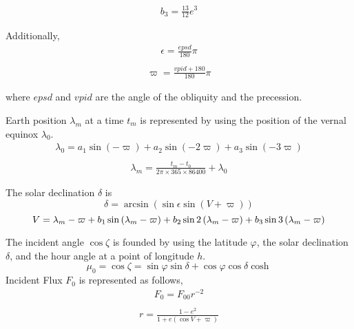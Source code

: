 \begin{equation}
\begin{array}{l}
b_{3}=\frac{13}{12} e^{3}
\end{array}
\end{equation}

Additionally, \begin{equation}
\begin{array}{l}
\epsilon=\frac{e p s d}{180} \pi \\
\end{array}
\end{equation} \begin{equation}
\begin{array}{l}
\varpi=\frac{v p i d+180}{180} \pi
\end{array}
\end{equation}

where \(epsd\) and \(vpid\) are the angle of the obliquity and the
precession.

Earth position \(\lambda_{m}\) at a time \(t_m\) is represented by using
the position of the vernal equinox \(\lambda_{0}\). \begin{equation}
\begin{array}{c}
\lambda_{0}=a_{1} \sin (-\varpi)+a_{2} \sin (-2 \varpi)+a_{3} \sin (-3 \varpi) \\
\end{array}
\end{equation} \begin{equation}
\begin{array}{c}
\lambda_{m}=\frac{t_{m}-t_{0}}{2 \pi \times 365 \times 86400}+\lambda_{0}
\end{array}
\end{equation}

The solar declination \(\delta\) is \begin{equation}
\delta=\arcsin (\sin \epsilon \sin (V+\varpi))
\end{equation} \begin{equation}
\\V=\lambda_{m}-\varpi+b_{1} \sin \left(\lambda_{m}-\varpi\right)+b_{2} \sin 2\left(\lambda_{m}-\varpi\right)+b_{3} \sin 3\left(\lambda_{m}-\varpi\right)
\end{equation}

The incident angle \(\cos \zeta\) is founded by using the latitude
\(\varphi\), the solar declination \(\delta\), and the hour angle at a
point of longitude \(h\). \begin{equation}
\mu_{0}=\cos \zeta=\sin \varphi \sin \delta+\cos \varphi \cos \delta \cosh
\end{equation} Incident Flux \(F_0\) is represented as follows, \begin{equation}
\begin{array}{c}
F_{0}=F_{00} r^{-2} \\
\end{array}
\end{equation} \begin{equation}
\begin{array}{c}
r=\frac{1-e^{2}}{1+e(\cos V+\varpi)}
\end{array}
\end{equation}

